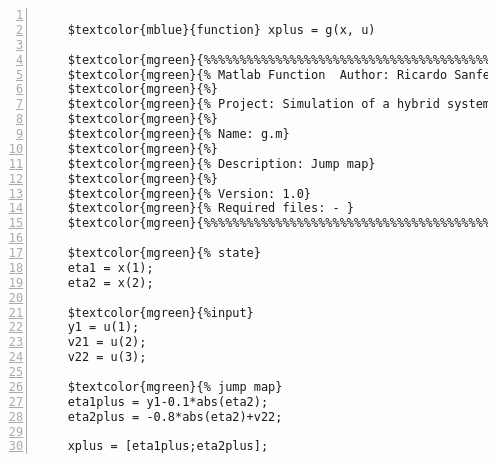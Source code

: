 %  
%  
%  
%  
  
  
\DefineShortVerb[fontfamily=courier,fontseries=m]{\$} 
\DefineShortVerb[fontfamily=courier,fontseries=b]{\#} 
  
\begin{Verbatim}[commandchars=\$\{\},numbers=left,numbersep=2pt] 

    $textcolor{mblue}{function} xplus = g(x, u) 
     
    $textcolor{mgreen}{%%%%%%%%%%%%%%%%%%%%%%%%%%%%%%%%%%%%%%%%%%%%%%%%%%%%%%%%%%%%%%%%%%%%%%%%%%%} 
    $textcolor{mgreen}{% Matlab Function  Author: Ricardo Sanfelice } 
    $textcolor{mgreen}{%} 
    $textcolor{mgreen}{% Project: Simulation of a hybrid system (interconnection)} 
    $textcolor{mgreen}{%} 
    $textcolor{mgreen}{% Name: g.m} 
    $textcolor{mgreen}{%} 
    $textcolor{mgreen}{% Description: Jump map} 
    $textcolor{mgreen}{%} 
    $textcolor{mgreen}{% Version: 1.0} 
    $textcolor{mgreen}{% Required files: - } 
    $textcolor{mgreen}{%%%%%%%%%%%%%%%%%%%%%%%%%%%%%%%%%%%%%%%%%%%%%%%%%%%%%%%%%%%%%%%%%%%%%%%%%%%} 
     
    $textcolor{mgreen}{% state} 
    eta1 = x(1); 
    eta2 = x(2); 
     
    $textcolor{mgreen}{%input} 
    y1 = u(1); 
    v21 = u(2); 
    v22 = u(3); 
     
    $textcolor{mgreen}{% jump map} 
    eta1plus = y1-0.1*abs(eta2); 
    eta2plus = -0.8*abs(eta2)+v22; 
     
    xplus = [eta1plus;eta2plus];  
\end{Verbatim}  
  
\UndefineShortVerb{\$} 
\UndefineShortVerb{\#} 
 